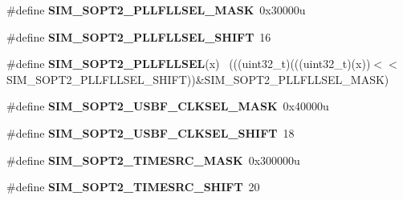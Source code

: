 \begin{DoxyCompactItemize}
\item 
\hypertarget{group___s_i_m___register___masks_gaa14141a225f9778babacbf3b90d0bae2}{}\#define {\bfseries S\+I\+M\+\_\+\+S\+O\+P\+T2\+\_\+\+P\+L\+L\+F\+L\+L\+S\+E\+L\+\_\+\+M\+A\+S\+K}~0x30000u\label{group___s_i_m___register___masks_gaa14141a225f9778babacbf3b90d0bae2}

\item 
\hypertarget{group___s_i_m___register___masks_gae98b4d574b65472bdb294092d4ce5b4a}{}\#define {\bfseries S\+I\+M\+\_\+\+S\+O\+P\+T2\+\_\+\+P\+L\+L\+F\+L\+L\+S\+E\+L\+\_\+\+S\+H\+I\+F\+T}~16\label{group___s_i_m___register___masks_gae98b4d574b65472bdb294092d4ce5b4a}

\item 
\hypertarget{group___s_i_m___register___masks_gade55259337a4b22868ce3b194ae0d078}{}\#define {\bfseries S\+I\+M\+\_\+\+S\+O\+P\+T2\+\_\+\+P\+L\+L\+F\+L\+L\+S\+E\+L}(x)                                  ~(((uint32\+\_\+t)(((uint32\+\_\+t)(x))$<$$<$S\+I\+M\+\_\+\+S\+O\+P\+T2\+\_\+\+P\+L\+L\+F\+L\+L\+S\+E\+L\+\_\+\+S\+H\+I\+F\+T))\&S\+I\+M\+\_\+\+S\+O\+P\+T2\+\_\+\+P\+L\+L\+F\+L\+L\+S\+E\+L\+\_\+\+M\+A\+S\+K)\label{group___s_i_m___register___masks_gade55259337a4b22868ce3b194ae0d078}

\item 
\hypertarget{group___s_i_m___register___masks_ga266fe3cbdae2b37bb3800b2d9bebd692}{}\#define {\bfseries S\+I\+M\+\_\+\+S\+O\+P\+T2\+\_\+\+U\+S\+B\+F\+\_\+\+C\+L\+K\+S\+E\+L\+\_\+\+M\+A\+S\+K}~0x40000u\label{group___s_i_m___register___masks_ga266fe3cbdae2b37bb3800b2d9bebd692}

\item 
\hypertarget{group___s_i_m___register___masks_ga6c7779cbd2f9307ca89f5f99093c11fe}{}\#define {\bfseries S\+I\+M\+\_\+\+S\+O\+P\+T2\+\_\+\+U\+S\+B\+F\+\_\+\+C\+L\+K\+S\+E\+L\+\_\+\+S\+H\+I\+F\+T}~18\label{group___s_i_m___register___masks_ga6c7779cbd2f9307ca89f5f99093c11fe}

\item 
\hypertarget{group___s_i_m___register___masks_gab50a6e7eaa3b552b96f8cd0450a95395}{}\#define {\bfseries S\+I\+M\+\_\+\+S\+O\+P\+T2\+\_\+\+T\+I\+M\+E\+S\+R\+C\+\_\+\+M\+A\+S\+K}~0x300000u\label{group___s_i_m___register___masks_gab50a6e7eaa3b552b96f8cd0450a95395}

\item 
\hypertarget{group___s_i_m___register___masks_ga808182bbe91aa5fedaede7122e4af1aa}{}\#define {\bfseries S\+I\+M\+\_\+\+S\+O\+P\+T2\+\_\+\+T\+I\+M\+E\+S\+R\+C\+\_\+\+S\+H\+I\+F\+T}~20\label{group___s_i_m___register___masks_ga808182bbe91aa5fedaede7122e4af1aa}


\end{DoxyCompactItemize}
